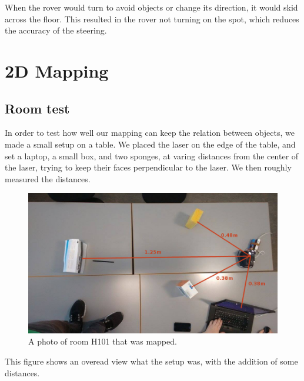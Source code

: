 When the rover would turn to avoid objects or change its direction, it would skid across the floor. This resulted in the rover not turning on the spot, which reduces the accuracy of the steering.

\clearpage
\section{2D Mapping}

\subsection{Room test}
In order to test how well our mapping can keep the relation between objects, we made a small setup on a table. We placed the laser on the edge of the table, and set a laptop, a small box, and two sponges, at varing distances from the center of the laser, trying to keep their faces perpendicular to the laser. We then roughly measured the distances.

\begin{figure}[H]
	\centering
	\includegraphics[scale=.4]{images/h101-photo.jpg}
	\caption{A photo of room H101 that was mapped.}
	\label{fig:internallidar}
\end{figure}
	
This figure shows an overead view what the setup was, with the addition of some distances.


